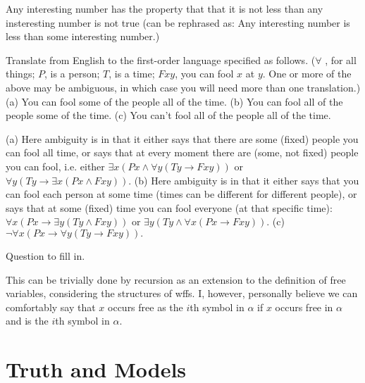 Any interesting number has the property that that it is not less than any insteresting number is not true (can be rephrased as: Any interesting number is less than some interesting number.)

\setcounter{exercise}{4}

\begin{exercise}
  Translate from English to the first-order language specified as follows. ($\forall$ , for all things; $P$, is a person; $T$, is a time; $Fxy$, you can fool $x$ at $y$. One or more of the above may be ambiguous, in which case you will need more than one translation.) (a) You can fool some of the people all of the time. (b) You can fool all of the people some of the time. (c) You can’t fool all of the people all of the time.
\end{exercise}

(a) Here ambiguity is in that it either says that there are some (fixed) people you can fool all time, or says that at every moment there are (some, not fixed) people you can fool, i.e. either $\exists x(Px\wedge\forall y(Ty\to Fxy))$ or $\forall y(Ty\to\exists x(Px\wedge Fxy))$. (b) Here ambiguity is in that it either says that you can fool each person at some time (times can be different for different people), or says that at some (fixed) time you can fool everyone (at that specific time): $\forall x(Px\to\exists y(Ty\wedge Fxy))$ or $\exists y(Ty\wedge\forall x(Px\to Fxy))$. (c) $\neg\forall x(Px\to\forall y(Ty\to Fxy)).$

\setcounter{exercise}{8}

\begin{exercise}
  Question to fill in.
\end{exercise}

This can be trivially done by recursion as an extension to the definition of free variables, considering the structures of wffs. I, however, personally believe we can comfortably say that $x$ occurs free as the $i$th symbol in $\alpha$ if $x$ occurs free in $\alpha$ and is the $i$th symbol in $\alpha$.

\section{Truth and Models}

